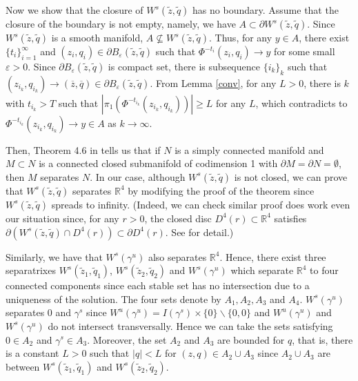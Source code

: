\documentclass[11pt,reqno]{amsart}
\begin{document}
Now we show that the closure of $W^s(\tilde{z},\tilde{q})$ has no boundary. Assume that the closure of the boundary is not empty, namely, we have $A\subset\partial W^s(\tilde{z},\tilde{q})$. Since $W^s(\tilde{z},\tilde{q})$ is a smooth manifold, $A\nsubseteq W^s(\tilde{z},\tilde{q})$. Thus, for any $y\in A$, there exist $\{t_i\}_{i=1}^\infty$ and $(z_i,q_i)\in \partial B_\varepsilon(\tilde{z},\tilde{q})$ such that $\Phi^{-t_i}(z_i,q_i)\to y$ for some small $\varepsilon>0$. Since $\partial B_\varepsilon(\tilde{z},\tilde{q})$ is compact set, there is subsequence $\{i_k\}_k$ such that $(z_{i_k},q_{i_k})\to(\overline{z},\overline{q})\in \partial B_\varepsilon(\tilde{z},\tilde{q})$. From Lemma \ref{conv}, for any $L>0$, there is $k$ with $t_{i_k}>T$ such that $|\pi_1(\Phi^{-t_{i_k}}(z_{i_k},q_{i_k}))|\geq L$ for any $L$, which contradicts to $\Phi^{-t_{i_k}}(z_{i_k},q_{i_k})\to y\in A$ as $k\to\infty$.


Then, Theorem 4.6 in \cite{Hirsch} tells us that if $N$ is a simply connected manifold and $M\subset N$ is a connected closed submanifold of codimension 1 with $\partial M=\partial N=\emptyset$, then $M$ separates $N$. In our case, although $W^s(\tilde{z},\tilde{q})$ is not closed, we can prove that $W^s(\tilde{z},\tilde{q})$  separates $\mathbb{R}^4$ by modifying the proof of the theorem since $W^s(\tilde{z},\tilde{q})$ spreads to infinity. (Indeed, we can check similar proof does work even our situation since, for any $r>0$, the closed disc $D^4(r)\subset\mathbb{R}^4$ satisfies $\partial(W^s(\tilde{z},\tilde{q})\cap D^4(r))\subset\partial D^4(r)$. See \cite{Hirsch} for detail.)

Similarly, we have that $W^s(\gamma^u)$ also separates $\mathbb{R}^4$. Hence, there exist three separatrixes $W^s(\tilde{z}_1,\tilde{q}_1)$, $W^s(\tilde{z}_2,\tilde{q}_2)$ and $W^s(\gamma^u)$ which separate $\mathbb{R}^4$ to four connected components since each stable set has no intersection due to a uniqueness of the solution.
The four sets denote by $A_1, A_2, A_3$ and $A_4$. $W^s(\gamma^u)$ separates 0 and $\gamma^s$ since $W^u(\gamma^u)=I(\gamma^s)\times\{0\}\backslash \{0,0\}$ and $W^u(\gamma^u)$ and $W^s(\gamma^u)$ do not intersect transversally. Hence we can take the sets satisfying $0\in A_2$ and $\gamma^s\in A_3$. Moreover, the set $A_2$ and $A_3$ are bounded for $q$, that is, there is a constant $L>0$ such that $|q|<L$ for $(z,q)\in A_2\cup A_3$ since $A_2\cup A_3$ are between $W^s(\tilde{z}_1,\tilde{q}_1)$ and $W^s(\tilde{z}_2,\tilde{q}_2)$. 
\end{document}
